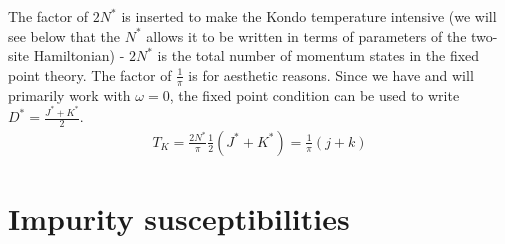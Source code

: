 \documentclass{report}
\numberwithin{equation}{section}
\begin{document}
The factor of \(2N^*\) is inserted to make the Kondo temperature intensive (we will see below that the \(N^*\) allows it to  be written in terms of parameters of the two-site Hamiltonian) - \(2N^*\) is the total number of momentum states in the fixed point theory. The factor of \(\frac{1}{\pi}\) is for aesthetic reasons. Since we have and will primarily work with \(\omega=0\), the fixed point condition can be used to write \(D^* = \frac{J^* + K^*}{2}\).
\begin{equation}\begin{aligned}
	T_K = \frac{2N^*}{\pi}\frac{1}{2}\left(J^* + K^*\right) = \frac{1}{\pi}\left(j + k\right)
\end{aligned}\end{equation}
\section{Impurity susceptibilities}
\end{document}
